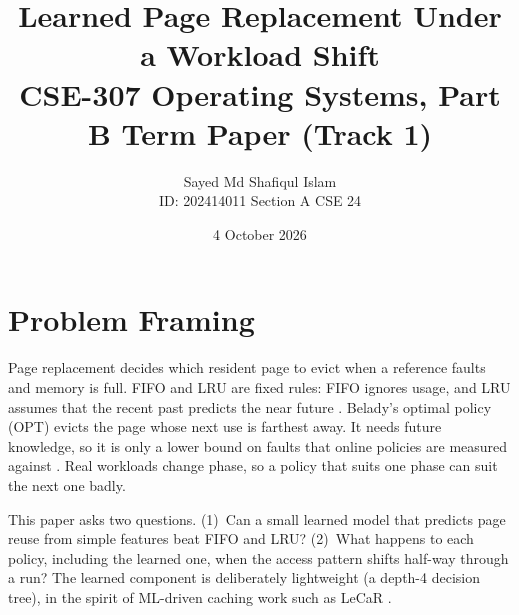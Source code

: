 \documentclass[10pt,a4paper]{article}
\title{\vspace{-1.2cm}\textbf{Learned Page Replacement Under a Workload Shift}\\[2pt]
\large CSE-307 Operating Systems, Part B Term Paper (Track 1)}
\author{Sayed Md Shafiqul Islam \\ ID: 202414011 \quad Section A \quad CSE 24}
\date{4 October 2026}
\begin{document}
\maketitle
\vspace{-0.8cm}

\section{Problem Framing}
Page replacement decides which resident page to evict when a reference faults and memory is full. FIFO and LRU are fixed rules: FIFO ignores usage, and LRU assumes that the recent past predicts the near future \cite{silberschatz}. Belady's optimal policy (OPT) evicts the page whose next use is farthest away. It needs future knowledge, so it is only a lower bound on faults that online policies are measured against \cite{belady,mattson}. Real workloads change phase, so a policy that suits one phase can suit the next one badly.

This paper asks two questions. (1)~Can a small learned model that predicts page reuse from simple features beat FIFO and LRU? (2)~What happens to each policy, including the learned one, when the access pattern shifts half-way through a run? The learned component is deliberately lightweight (a depth-4 decision tree), in the spirit of ML-driven caching work such as LeCaR \cite{lecar}.
\end{document}
